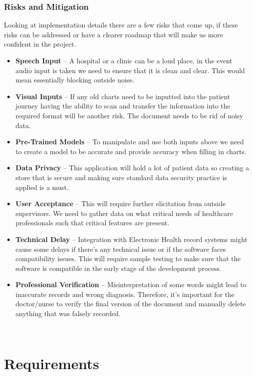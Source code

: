 \documentclass[12pt]{article}
\begin{document}
\subsubsection{Risks and Mitigation}

Looking at implementation details there are a few risks that come up, if these risks can be addressed or have a clearer roadmap that will make us more confident in the project. 

\begin{itemize}
  \item \textbf{Speech Input} -- A hospital or a clinic can be a loud place, in the event audio input is taken we need to ensure that it is clean and clear. This would mean essentially blocking outside noise. 
  \item \textbf{Visual Inputs} -- If any old charts need to be inputted into the patient journey having the ability to scan and transfer the information into the required format will be another risk. The document needs to be rid of noisy data.
  \item \textbf{Pre-Trained Models} -- To manipulate and use both inputs above we need to create a model to be accurate and provide accuracy when filling in charts. 
  \item \textbf{Data Privacy} -- This application will hold a lot of patient data so creating a store that is secure and making sure standard data security practice is applied is a must.
  \item \textbf{User Acceptance} -- This will require further elicitation from outside supervisors. We need to gather data on what critical needs of healthcare professionals such that critical features are present.
  \item \textbf{Technical Delay} – Integration with Electronic Health record systems might cause some delays if there’s any technical issue or if the software faces compatibility issues. This will require sample testing to make sure that the software is compatible in the early stage of the development process.
  \item \textbf{Professional Verification} – Misinterpretation of some words might lead to inaccurate records and wrong diagnosis. Therefore, it’s important for the doctor/nurse to verify the final version of the document and manually delete anything that was falsely recorded. 
\end{itemize}

~\newpage

\section{Requirements}
\end{document}
